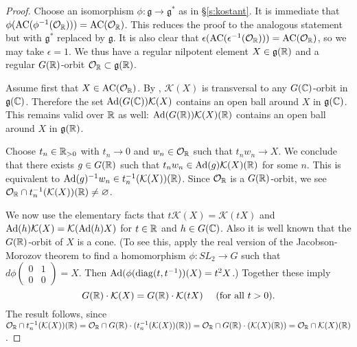 \documentclass{article}
\theoremstyle{definition}
\numberwithin{equation}{section}
\renewcommand{\-}{\hyp{}}
\newcommand{\g}{\mathfrak g}
\renewcommand{\O}{\mathcal O}
\newcommand{\K}{\mathcal K}
\newcommand{\AC}{\mathrm{AC}}
\begin{document}
\begin{proof}
Choose an isomorphism $\phi : \g \to \g^*$ as in \S\ref{s:kostant}. It is immediate that $\phi(\AC(\phi^{-1}(\O_\R)))=\AC(\O_\R)$. This reduces the proof to the analogous statement but with $\g^*$ replaced by $\g$. It is also clear that $\epsilon(\AC(\epsilon^{-1}(\O_\R)))=\AC(\O_\R)$, so we may take $\epsilon=1$. We thus have a regular nilpotent element $X \in \g(\R)$ and a regular $G(\mathbb{R})$-orbit $\O_\R \subset \g(\R)$. 

Assume first that $X \in \AC(\O_\R)$. By \cite{Kos63}, $\K(X)$ is transversal to any $G(\mathbb{C})$-orbit in $\g(\C)$. Therefore the set $\tx{Ad}(G(\C))\K(X)$ contains an open ball around $X$ in $\g(\C)$.
This remains valid over $\mathbb{R}$ as well: $\tx{Ad}(G(\R))\K(X)(\R)$ contains an open ball around $X$ in $\g(\R)$.

Choose $t_n \in \mathbb{R}_{>0}$ with $t_n \to 0$ and $w_n \in \O_\R$ such that $t_nw_n \to X$. We conclude that there exists $g \in G(\mathbb{R})$ such that $t_nw_n \in \tx{Ad}(g)\K(X)(\R)$ for some $n$. This is equivalent to $\tx{Ad}(g)^{-1}w_n \in t_n^{-1}(\K(X))(\R)$. Since $\O_\R$ is a $G(\mathbb{R})$-orbit, we see $\O_\R \cap t_n^{-1}(\K(X))(\R) \neq \varnothing$. 

We now use the elementary facts that $t\K(X)=\K(tX)$ and $\tx{Ad}(h)\K(X)=\K(\tx{Ad}(h)X)$ for $t \in \mathbb{R}$ and $h \in G(\mathbb{C})$.
Also it is well known that the $G(\mathbb{R})$-orbit of $X$ is a cone. (To see this, apply the real version of the Jacobson-Morozov theorem
\cite[Theorem 9.2.1]{CM} to  find a homomorphism $\phi:SL_2\rightarrow G$ such that $d\phi\begin{pmatrix}0&1\\0&0\end{pmatrix}=X$.
Then $\textrm{Ad}(\phi(\mathrm{diag}(t,t^{-1}))(X)=t^2X$.)
Together these imply
\begin{equation}
\label{e:scale}
G(\R)\cdot \K(X)=G(\R)\cdot \K(tX) \quad \text{ (for all $t>0$).}
\end{equation}
The result follows, since
$\O_\R \cap t_n^{-1}(\K(X))(\R)=\O_\R \cap G(\R)\cdot(t_n^{-1}(\K(X))(\R))=
\O_\R \cap G(\R)\cdot(\K(X)(\R))=\O_\R\cap \K(X)(\R)$.


\end{proof}
\end{document}
